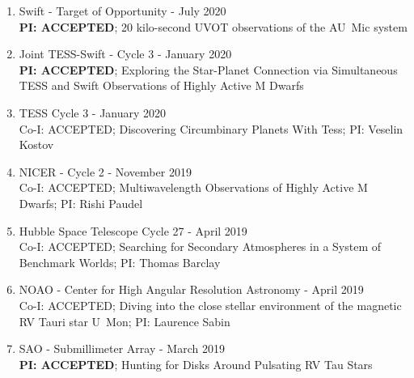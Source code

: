 \documentclass[letter,11pt]{article}
\begin{document}
\begin{enumerate}[\bfseries 1.]
\item Swift - Target of Opportunity - July 2020 \\
\textbf{PI: ACCEPTED}; 20 kilo-second UVOT observations of the AU~Mic system

\item Joint TESS-Swift - Cycle 3 - January 2020 \\
\textbf{PI: ACCEPTED}; Exploring the Star-Planet Connection via Simultaneous TESS and Swift Observations of Highly Active M Dwarfs

\item TESS Cycle 3 - January 2020 \\
Co-I: ACCEPTED; Discovering Circumbinary Planets With Tess; PI: Veselin Kostov

\item NICER - Cycle 2 - November 2019 \\
Co-I: ACCEPTED; Multiwavelength Observations of Highly Active M Dwarfs; PI: Rishi Paudel


\item Hubble Space Telescope Cycle 27 - April 2019 \\
Co-I: ACCEPTED; Searching for Secondary Atmospheres in a System of Benchmark Worlds; PI: Thomas Barclay

\item NOAO - Center for High Angular Resolution Astronomy - April 2019\\
Co-I: ACCEPTED; Diving into the close stellar environment of the magnetic
RV Tauri star U~Mon; PI: Laurence Sabin


\item SAO - Submillimeter Array - March 2019 \\
 \textbf{PI: ACCEPTED}; Hunting for Disks Around Pulsating RV Tau Stars


\end{enumerate}
\end{document}
